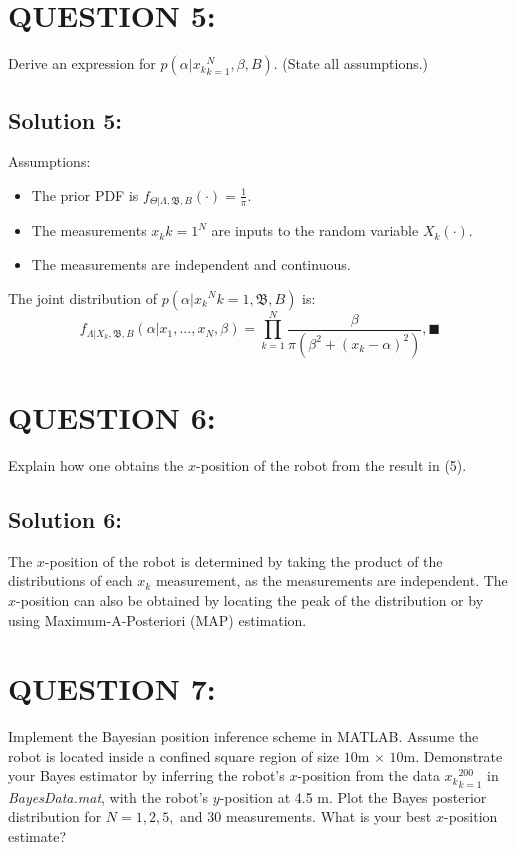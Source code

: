 \documentclass[a4paper,11pt]{article}
\begin{document}
\section{QUESTION 5:}
Derive an expression for $p(\alpha | {x_k}^N _{k=1}, \beta, B)$. (State all assumptions.)

\subsection*{Solution 5:} Assumptions: \begin{itemize} \item The prior PDF is $f_{\Theta|\Lambda, \mathfrak{B},B}(\cdot) = \frac{1}{\pi}$. \item The measurements ${x_k}{k=1}^N$ are inputs to the random variable $X_k(\cdot)$. \item The measurements are independent and continuous. \end{itemize} The joint distribution of $p(\alpha | {x_k}^N{k=1}, \mathfrak{B}, B)$ is: \begin{equation} f_{\Lambda | X_k, \mathfrak{B},B} (\alpha | x_1,...,x_N, \beta) = \prod^N _{k=1} \frac{\beta}{\pi (\beta^2 + (x_k - \alpha)^2)} , \blacksquare \end{equation}

\section{QUESTION 6:}
Explain how one obtains the $x$-position of the robot from the result in (5).

\subsection*{Solution 6:} The $x$-position of the robot is determined by taking the product of the distributions of each $x_k$ measurement, as the measurements are independent. The $x$-position can also be obtained by locating the peak of the distribution or by using Maximum-A-Posteriori (MAP) estimation.

\section{QUESTION 7:}
Implement the Bayesian position inference scheme in MATLAB. Assume the robot is located inside a confined square region of size $10$m $\times$ $10$m. Demonstrate your Bayes estimator by inferring the robot’s $x$-position from the data ${ x_k }^{200}_{k=1}$ in \emph{BayesData.mat}, with the robot’s $y$-position at 4.5 m. Plot the Bayes posterior distribution for $N = 1, 2, 5,$ and $30$ measurements. What is your best $x$-position estimate?
\end{document}
